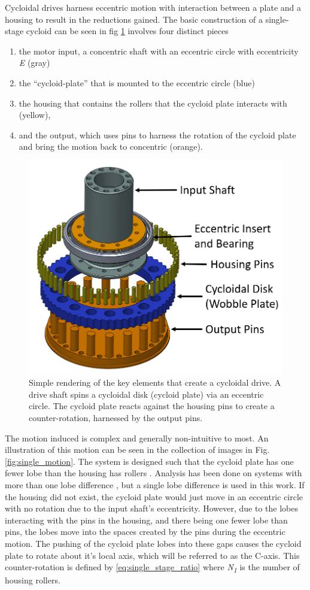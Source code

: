 Cycloidal drives harness eccentric motion with interaction between a plate and a housing to result in the reductions gained. The basic construction of a single-stage cycloid can be seen in fig \ref{fig:single_cartoon} involves four distinct pieces
\begin{enumerate}
	\item the motor input, a concentric shaft with an eccentric circle with eccentricity \textit{E} (gray)
	\item the ``cycloid-plate'' that is mounted to the eccentric circle (blue)
	\item the housing that contains the rollers that the cycloid plate interacts with (yellow),
	\item and the output, which uses pins to harness the rotation of the cycloid plate and bring the motion back to concentric (orange).
\end{enumerate}

\begin{figure}[h]
   \centering
   \includegraphics[width=0.60\linewidth]{fig/cycloid_cartoon_v2}
   \caption{Simple rendering of the key elements that create a cycloidal drive.
   A drive shaft spins a cycloidal disk (cycloid plate) via an eccentric circle.
   The cycloid plate reacts against the housing pins to create a counter-rotation, harnessed by the output pins.}
   \label{fig:single_cartoon}
\end{figure}

The motion induced is complex and generally non-intuitive to most. An illustration of this motion can be seen in the collection of images in Fig. \ref{fig:single_motion}. The system is designed such that the cycloid plate has one fewer lobe than the housing has rollers \cite{ref:pollitt}. Analysis has been done on systems with more than one lobe difference \cite{ref:hsieh_traditional}, but a single lobe difference is used in this work. If the housing did not exist, the cycloid plate would just move in an eccentric circle with no rotation due to the input shaft's eccentricity. However, due to the lobes interacting with the pins in the housing, and there being one fewer lobe than pins, the lobes move into the spaces created by the pins during the eccentric motion. The pushing of the cycloid plate lobes into these gaps causes the cycloid plate to rotate about it's local axis, which will be referred to as the C-axis. This counter-rotation is defined by \ref{eq:single_stage_ratio} \cite{ref:on_the_lobe} where \textit{N\textsubscript{1}} is the number of housing rollers.

